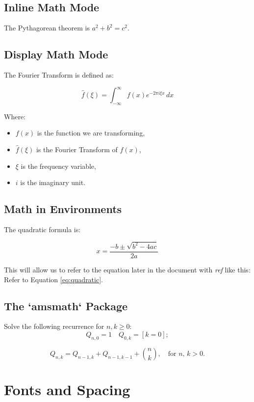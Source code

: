 \documentclass{article}
\newcommand{\cmd}[1]{\textit{#1}}
\begin{document}
\subsection{Inline Math Mode}

The Pythagorean theorem is $a^2 + b^2 = c^2$.

\subsection{Display Math Mode}

The Fourier Transform is defined as:

\[
\hat{f}(\xi) = \int_{-\infty}^\infty f(x) e^{-2\pi i \xi x} \, dx
\]

Where:
\begin{itemize}
  \item \( f(x) \) is the function we are transforming,
  \item \( \hat{f}(\xi) \) is the Fourier Transform of \( f(x) \),
  \item \( \xi \) is the frequency variable,
  \item \( i \) is the imaginary unit.
\end{itemize}

\subsection{Math in Environments}

The quadratic formula is:

\begin{equation}
x = \frac{-b \pm \sqrt{b^2 - 4ac}}{2a}
\label{eq:quadratic}
\end{equation}

This will allow us to refer to the equation later in the document with \cmd{ref} like this:
Refer to Equation \ref{eq:quadratic}.

\subsection{The `amsmath` Package}

Solve the following recurrence for $ n,k\geq 0 $:
\[
Q_{n,0} = 1   \quad Q_{0,k} = [k=0];
\]

\[
Q_{n,k} = Q_{n-1,k}+Q_{n-1,k-1}+\binom{n}{k}, \quad\text{for $n$, $k>0$.}
\]

\section{Fonts and Spacing}

\lipsum[1-2]
\end{document}
